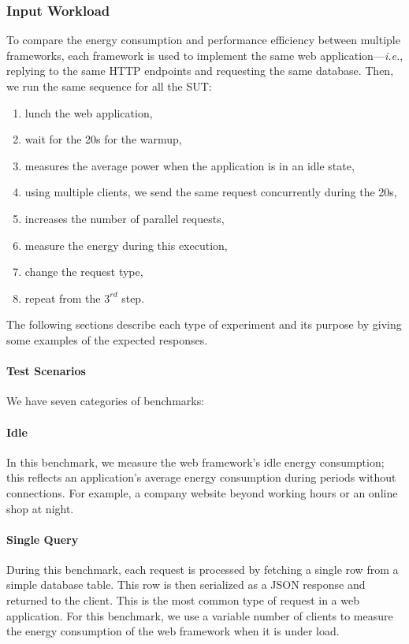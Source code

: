 \subsubsection{Input Workload}
To compare the energy consumption and performance efficiency between multiple frameworks, each framework is used to implement the same web application---\emph{i.e.}, replying to the same HTTP endpoints and requesting the same database. Then, we run the same sequence for all the SUT:
\begin{enumerate}
    \item lunch the web application,
    \item wait for the 20s for the warmup,
    \item measures the average power when the application is in an idle state,
    \item using multiple clients, we send the same request concurrently during the 20s,
    \item increases the number of parallel requests,
    \item measure the energy during this execution,
    \item change the request type,
    \item repeat from the $3^{rd}$ step.
\end{enumerate}

The following sections describe each type of experiment and its purpose by giving some examples of the expected responses.

\paragraph{Test Scenarios}
We have seven categories of benchmarks:
\paragraph{Idle}
In this benchmark, we measure the web framework's idle energy consumption; this reflects an application's average energy consumption during periods without connections.
For example, a company website beyond working hours or an online shop at night.

\paragraph{Single Query}
During this benchmark, each request is processed by fetching a single row from a simple database table.
This row is then serialized as a JSON response and returned to the client.
This is the most common type of request in a web application.
For this benchmark, we use a variable number of clients to measure the energy consumption of the web framework when it is under load.



